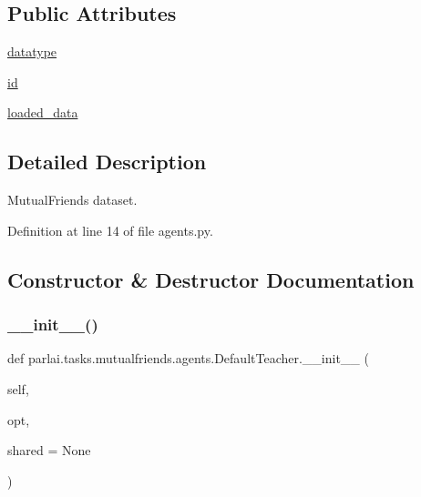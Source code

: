 \subsection*{Public Attributes}
\begin{DoxyCompactItemize}
\item 
\hyperlink{classparlai_1_1tasks_1_1mutualfriends_1_1agents_1_1DefaultTeacher_a72fe5fce4948609f6744730626aef8b1}{datatype}
\item 
\hyperlink{classparlai_1_1tasks_1_1mutualfriends_1_1agents_1_1DefaultTeacher_a61d23236d8ab996b4bc7c72d4f966ba9}{id}
\item 
\hyperlink{classparlai_1_1tasks_1_1mutualfriends_1_1agents_1_1DefaultTeacher_a36b8bfe95e840334f7db7fe93f54c646}{loaded\+\_\+data}
\end{DoxyCompactItemize}


\subsection{Detailed Description}
\begin{DoxyVerb}MutualFriends dataset.
\end{DoxyVerb}
 

Definition at line 14 of file agents.\+py.



\subsection{Constructor \& Destructor Documentation}
\mbox{\label{classparlai_1_1tasks_1_1mutualfriends_1_1agents_1_1DefaultTeacher_a61e000a690cb89a9c8fe20692d1f8106}} 
\subsubsection{\texorpdfstring{\+\_\+\+\_\+init\+\_\+\+\_\+()}{\_\_init\_\_()}}
{\footnotesize\ttfamily def parlai.\+tasks.\+mutualfriends.\+agents.\+Default\+Teacher.\+\_\+\+\_\+init\+\_\+\+\_\+ (\begin{DoxyParamCaption}\item[{}]{self,  }\item[{}]{opt,  }\item[{}]{shared = {\ttfamily None} }\end{DoxyParamCaption})}



